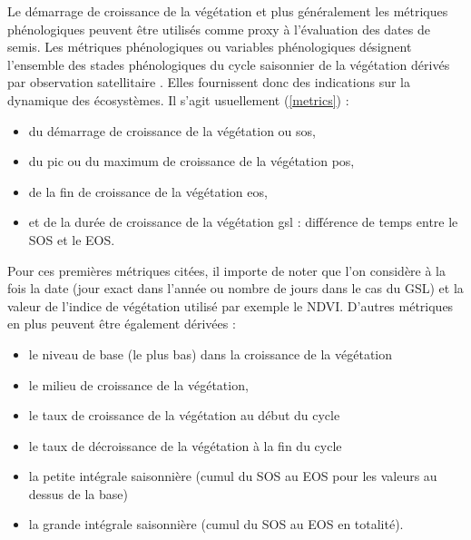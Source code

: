 Le démarrage de croissance de la végétation et plus généralement les métriques phénologiques peuvent être utilisés comme proxy à l'évaluation des dates de semis. Les métriques phénologiques
ou variables phénologiques désignent l'ensemble des stades phénologiques du cycle saisonnier de la végétation dérivés par observation satellitaire \citep{Helman2018}. Elles fournissent 
donc des indications sur la dynamique des écosystèmes.
Il s'agit usuellement (\cref{metrics}) : 
\begin{itemize}
 \item du démarrage de croissance de la végétation ou \acrshort{sos},
 \item du pic ou du maximum de croissance de la végétation \acrshort{pos},
 \item de la fin de croissance de la végétation \acrshort{eos},
 \item et de la durée de croissance de la végétation \acrshort{gsl} : différence de temps entre le SOS et le EOS.
\end{itemize}
Pour ces premières métriques citées, il importe de noter que l'on considère à la fois la date (jour exact dans l'année ou nombre de jours dans le cas du GSL) et la valeur de l'indice de 
végétation utilisé par exemple le NDVI. D'autres métriques en plus peuvent être également dérivées : 
\begin{itemize}
 \item le niveau de base (le plus bas) dans la croissance de la végétation
 \item le milieu de croissance de la végétation,
 \item le taux de croissance de la végétation au début du cycle
 \item le taux de décroissance de la végétation à la fin du cycle
 \item la petite intégrale saisonnière (cumul du SOS au EOS pour les valeurs au dessus de la base)
 \item la grande intégrale saisonnière (cumul du SOS au EOS en totalité).
\end{itemize}

